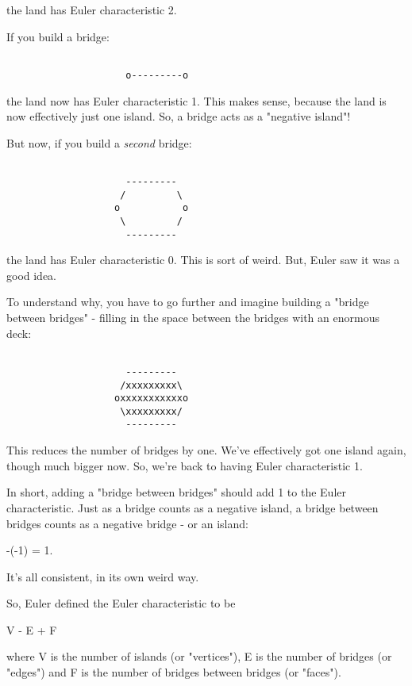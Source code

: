 the land has Euler characteristic 2.

If you build a bridge:


\begin{verbatim}

                     o---------o
\end{verbatim}
    

the land now has Euler characteristic 1.  This makes sense, because
the land is now effectively just one island.  So, a bridge acts as a
"negative island"!

But now, if you build a \emph{second} bridge:


\begin{verbatim}

                     --------- 
                    /         \
                   o           o
                    \         /
                     ---------
\end{verbatim}
    
the land has Euler characteristic 0.  This is sort of weird.  But, Euler
saw it was a good idea.

To understand why, you have to go further and imagine building a
"bridge between bridges" - filling in the space between the
bridges with an enormous deck:


\begin{verbatim}

                     --------- 
                    /xxxxxxxxx\
                   oxxxxxxxxxxxo
                    \xxxxxxxxx/
                     ---------
\end{verbatim}
    

This reduces the number of bridges by one.  We've effectively got one
island again, though much bigger now.  So, we're back to having Euler
characteristic 1.

In short, adding a "bridge between bridges" should add 1 to
the Euler characteristic.  Just as a bridge counts as a negative
island, a bridge between bridges counts as a negative bridge - or an
island:

-(-1) = 1.  

It's all consistent, in its own weird way.

So, Euler defined the Euler characteristic to be 

V - E + F

where V is the number of islands (or "vertices"), E is the
number of bridges (or "edges") and F is the number of
bridges between bridges (or "faces").

